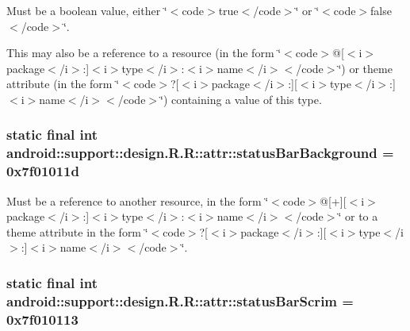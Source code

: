 Must be a boolean value, either \char`\"{}$<$code$>$true$<$/code$>$\char`\"{} or \char`\"{}$<$code$>$false$<$/code$>$\char`\"{}. 

This may also be a reference to a resource (in the form \char`\"{}$<$code$>$@\mbox{[}$<$i$>$package$<$/i$>$:\mbox{]}$<$i$>$type$<$/i$>$:$<$i$>$name$<$/i$>$$<$/code$>$\char`\"{}) or theme attribute (in the form \char`\"{}$<$code$>$?\mbox{[}$<$i$>$package$<$/i$>$:\mbox{]}\mbox{[}$<$i$>$type$<$/i$>$:\mbox{]}$<$i$>$name$<$/i$>$$<$/code$>$\char`\"{}) containing a value of this type. \hypertarget{classandroid_1_1support_1_1design_1_1_r_1_1attr_5d2d91729b71ea7c3941498d1377307e}{
\subsubsection[{statusBarBackground}]{\setlength{\rightskip}{0pt plus 5cm}static final int android::support::design.R.R::attr::statusBarBackground = 0x7f01011d}}
\label{classandroid_1_1support_1_1design_1_1_r_1_1attr_5d2d91729b71ea7c3941498d1377307e}


Must be a reference to another resource, in the form \char`\"{}$<$code$>$@\mbox{[}+\mbox{]}\mbox{[}$<$i$>$package$<$/i$>$:\mbox{]}$<$i$>$type$<$/i$>$:$<$i$>$name$<$/i$>$$<$/code$>$\char`\"{} or to a theme attribute in the form \char`\"{}$<$code$>$?\mbox{[}$<$i$>$package$<$/i$>$:\mbox{]}\mbox{[}$<$i$>$type$<$/i$>$:\mbox{]}$<$i$>$name$<$/i$>$$<$/code$>$\char`\"{}. \hypertarget{classandroid_1_1support_1_1design_1_1_r_1_1attr_7a3178f36d7f858b0d500fd9d47ce9b9}{
\subsubsection[{statusBarScrim}]{\setlength{\rightskip}{0pt plus 5cm}static final int android::support::design.R.R::attr::statusBarScrim = 0x7f010113}}
\label{classandroid_1_1support_1_1design_1_1_r_1_1attr_7a3178f36d7f858b0d500fd9d47ce9b9}


